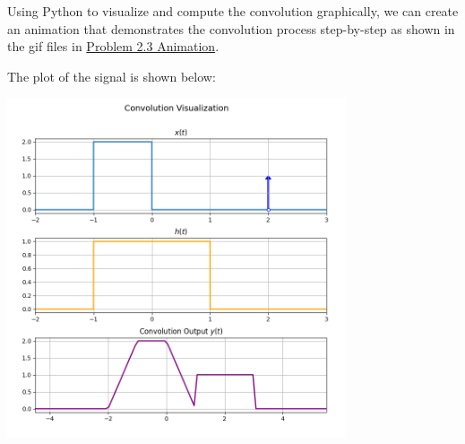 \documentclass[a4paper, 10pt]{article}
\begin{document}
\begin{tosubmit}
\begin{subproblems}[start=3]
    \item \submitsolution
\end{subproblems}

Using Python to visualize and compute the convolution graphically,
we can create an animation that demonstrates the convolution process step-by-step
as shown in the gif files in \href{https://github.com/patthadon-p/CEDT-2110203-CEM-II/blob/main/signal/homework-2/images/problem_2_3.gif}{Problem 2.3 Animation}.

\vspace{3mm}

The plot of the signal is shown below:
\begin{center}
    \includegraphics[width=0.75\textwidth]{images/problem_2_3_snapshot.png}
\end{center}
\end{tosubmit}

\newpage 

\begin{subproblems}[start=4]
    \item
\end{subproblems}
\end{document}
